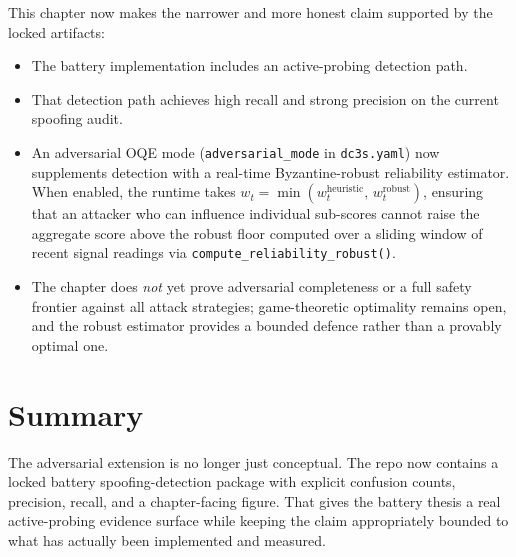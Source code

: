 This chapter now makes the narrower and more honest claim supported by the
locked artifacts:

\begin{itemize}
  \item The battery implementation includes an active-probing detection path.
  \item That detection path achieves high recall and strong precision on the
    current spoofing audit.
  \item An adversarial OQE mode (\texttt{adversarial\_mode} in
    \texttt{dc3s.yaml}) now supplements detection with a real-time
    Byzantine-robust reliability estimator.  When enabled, the runtime takes
    $w_t = \min(w_t^{\mathrm{heuristic}},\, w_t^{\mathrm{robust}})$,
    ensuring that an attacker who can influence individual sub-scores
    cannot raise the aggregate score above the robust floor computed over
    a sliding window of recent signal readings via
    \texttt{compute\_reliability\_robust()}.
  \item The chapter does \emph{not} yet prove adversarial completeness or a
    full safety frontier against all attack strategies; game-theoretic
    optimality remains open, and the robust estimator provides a bounded
    defence rather than a provably optimal one.
\end{itemize}

\section{Summary}

The adversarial extension is no longer just conceptual.  The repo now
contains a locked battery spoofing-detection package with explicit confusion
counts, precision, recall, and a chapter-facing figure.  That gives the
battery thesis a real active-probing evidence surface while keeping the claim
appropriately bounded to what has actually been implemented and measured.
